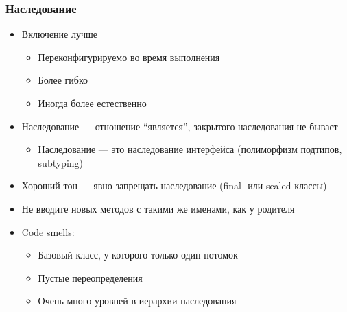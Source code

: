 \documentclass{../../slides-style}
\begin{document}
    \begin{frame}
        \frametitle{Наследование}
        \begin{itemize}
            \item Включение лучше
            \begin{itemize}
                \item Переконфигурируемо во время выполнения
                \item Более гибко
                \item Иногда более естественно
            \end{itemize}
            \item Наследование --- отношение ``является'', закрытого наследования не бывает
            \begin{itemize}
                \item Наследование --- это наследование интерфейса (полиморфизм подтипов, subtyping)
            \end{itemize}
            \item Хороший тон --- явно запрещать наследование (final- или sealed-классы)
            \item Не вводите новых методов с такими же именами, как у родителя
            \item Code smells:
            \begin{itemize}
                \item Базовый класс, у которого только один потомок
                \item Пустые переопределения
                \item Очень много уровней в иерархии наследования
            \end{itemize}
        \end{itemize}
    \end{frame}
\end{document}
